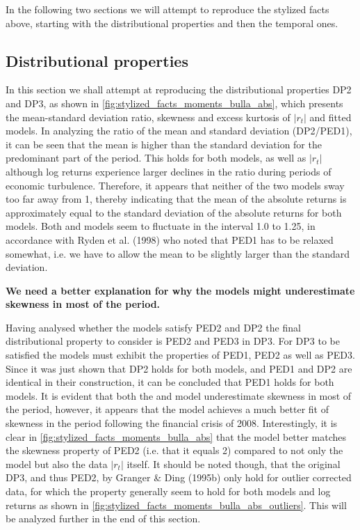 In the following two sections we will attempt to reproduce the stylized facts above, starting with the distributional properties and then the temporal ones.

\subsection{Distributional properties}
\label{Sec: Distributional properties}

In this section we shall attempt at reproducing the distributional properties DP2 and DP3, as shown in \cref{fig:stylized_facts_moments_bulla_abs}, which presents the mean-standard deviation ratio, skewness and excess kurtosis of $|r_t|$ and fitted models. In analyzing the ratio of the mean and standard deviation (DP2/PED1), it can be seen that the mean is higher than the standard deviation for the predominant part of the period. This holds for both models, as well as $|r_t|$ although log returns experience larger declines in the ratio during periods of economic turbulence. Therefore, it appears that neither of the two models sway too far away from 1, thereby indicating that the mean of the absolute returns is approximately equal to the standard deviation of the absolute returns for both models. Both \mle and \jump models seem to fluctuate in the interval 1.0 to 1.25, in accordance with Ryden et al. (1998) who noted that PED1 has to be relaxed somewhat, i.e. we have to allow the mean to be slightly larger than the standard deviation.

\textbf{We need a better explanation for why the models might underestimate skewness in most of the period.}

Having analysed whether the models satisfy PED2 and DP2 the final distributional property to consider is PED2 and PED3 in DP3. For DP3 to be satisfied the models must exhibit the properties of PED1, PED2 as well as PED3. Since it was just shown that DP2 holds for both models, and PED1 and DP2 are identical in their construction, it can be concluded that PED1 holds for both models. It is evident that both the \mle and \jump model underestimate skewness in most of the period, however, it appears that the \jump model achieves a much better fit of skewness in the period following the financial crisis of 2008. Interestingly, it is clear in \cref{fig:stylized_facts_moments_bulla_abs} that the \mle model better matches the skewness property of PED2 (i.e. that it equals 2) compared to not only the \jump model but also the data $|r_t|$ itself. It should be noted though, that the original DP3, and thus PED2, by Granger \& Ding (1995b) only hold for outlier corrected data, for which the property generally seem to hold for both models and log returns as shown in \cref{fig:stylized_facts_moments_bulla_abs_outliers}. This will be analyzed further in the end of this section.

